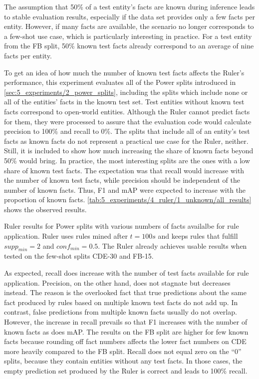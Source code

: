 The assumption that 50\% of a test entity's facts are known during inference leads to stable evaluation results, especially if the data set provides only a few facts per entity. However, if many facts are available, the scenario no longer corresponds to a few-shot use case, which is particularly interesting in practice. For a test entity from the FB split, 50\% known test facts already correspond to an average of nine facts per entity.

To get an idea of how much the number of known test facts affects the Ruler's performance, this experiment evaluates all of the Power splits introduced in \autoref{sec:5_experiments/2_power_splits}, including the splits which include none or all of the entities' facts in the known test set. Test entities without known test facts correspond to open-world entities. Although the Ruler cannot predict facts for them, they were processed to assure that the evaluation code would calculate precision to 100\% and recall to 0\%. The splits that include all of an entity's test facts as known facts do not represent a practical use case for the Ruler, neither. Still, it is included to show how much increasing the share of known facts beyond 50\% would bring. In practice, the most interesting splits are the ones with a low share of known test facts. The expectation was that recall would increase with the number of known test facts, while precision should be independent of the number of known facts. Thus, F1 and mAP were expected to increase with the proportion of known facts. \autoref{tab:5_experiments/4_ruler/1_unknown/all_results} shows the observed results.

\begin{table}
    \centering
    
    \caption{Ruler results for Power splits with various numbers of facts availalbe for rule application. Ruler uses rules mined after $t = 100s$ and keeps rules that fulfill $supp_{min} = 2$ and $conf_{min} = 0.5$. The Ruler already achieves usable results when tested on the few-shot splits CDE-30 and FB-15.}
    \label{tab:5_experiments/4_ruler/1_unknown/all_results}
\end{table}

As expected, recall does increase with the number of test facts available for rule application. Precision, on the other hand, does not stagnate but decreases instead. The reason is the overlooked fact that true predictions about the same fact produced by rules based on multiple known test facts do not add up. In contrast, false predictions from multiple known facts usually do not overlap. However, the increase in recall prevails so that F1 increases with the number of known facts as does mAP. The results on the FB split are higher for few known facts because rounding off fact numbers affects the lower fact numbers on CDE more heavily compared to the FB split. Recall does not equal zero on the ``0'' splits, because they contain entities without any test facts. In those cases, the empty prediction set produced by the Ruler is correct and leads to 100\% recall.
